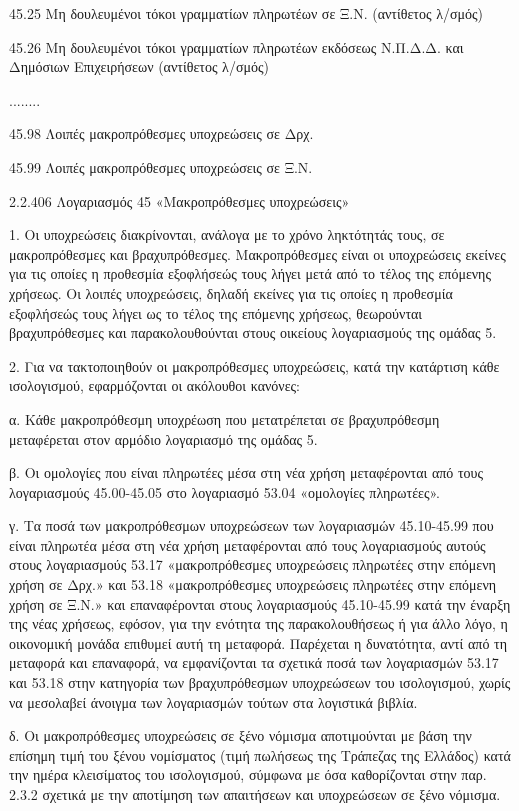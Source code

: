 \documentclass[A4,10pt,greek]{book}
\begin{document}
        45.25   Μη δουλευμένοι τόκοι γραμματίων πληρωτέων σε Ξ.Ν. (αντίθετος
                     λ/σμός)

        45.26   Μη δουλευμένοι τόκοι γραμματίων πληρωτέων εκδόσεως Ν.Π.Δ.Δ.
                     και Δημόσιων Επιχειρήσεων (αντίθετος λ/σμός)

        ........

        45.98   Λοιπές μακροπρόθεσμες υποχρεώσεις σε Δρχ.

        45.99   Λοιπές μακροπρόθεσμες υποχρεώσεις σε Ξ.Ν.

 

2.2.406 Λογαριασμός 45 «Μακροπρόθεσμες υποχρεώσεις»

1. Οι υποχρεώσεις διακρίνονται, ανάλογα με το χρόνο ληκτότητάς τους, σε μακροπρόθεσμες και βραχυπρόθεσμες. Μακροπρόθεσμες είναι οι υποχρεώσεις εκείνες για τις οποίες η προθεσμία εξοφλήσεώς τους λήγει μετά από το τέλος της επόμενης χρήσεως. Οι λοιπές υποχρεώσεις, δηλαδή εκείνες για τις οποίες η προθεσμία εξοφλήσεώς τους λήγει ως το τέλος της επόμενης χρήσεως, θεωρούνται βραχυπρόθεσμες και παρακολουθούνται στους οικείους λογαριασμούς της ομάδας 5.

2. Για να τακτοποιηθούν οι μακροπρόθεσμες υποχρεώσεις, κατά την κατάρτιση κάθε ισολογισμού, εφαρμόζονται οι ακόλουθοι κανόνες:

α. Κάθε μακροπρόθεσμη υποχρέωση που μετατρέπεται σε βραχυπρόθεσμη μεταφέρεται στον αρμόδιο λογαριασμό της ομάδας 5.

β. Οι ομολογίες που είναι πληρωτέες μέσα στη νέα χρήση μεταφέρονται από τους λογαριασμούς 45.00-45.05 στο λογαριασμό 53.04 «ομολογίες πληρωτέες».

γ. Τα ποσά των μακροπρόθεσμων υποχρεώσεων των λογαριασμών 45.10-45.99 που είναι πληρωτέα μέσα στη νέα χρήση μεταφέρονται από τους λογαριασμούς αυτούς στους λογαριασμούς 53.17 «μακροπρόθεσμες υποχρεώσεις πληρωτέες στην επόμενη χρήση σε Δρχ.» και 53.18 «μακροπρόθεσμες υποχρεώσεις πληρωτέες στην επόμενη χρήση σε Ξ.Ν.» και επαναφέρονται στους λογαριασμούς 45.10-45.99 κατά την έναρξη της νέας χρήσεως, εφόσον, για την ενότητα της παρακολουθήσεως ή για άλλο λόγο, η οικονομική μονάδα επιθυμεί αυτή τη μεταφορά. Παρέχεται η δυνατότητα, αντί από τη μεταφορά και επαναφορά, να εμφανίζονται τα σχετικά ποσά των λογαριασμών 53.17 και 53.18 στην κατηγορία των βραχυπρόθεσμων υποχρεώσεων του ισολογισμού, χωρίς να μεσολαβεί άνοιγμα των λογαριασμών τούτων στα λογιστικά βιβλία.

δ. Οι μακροπρόθεσμες υποχρεώσεις σε ξένο νόμισμα αποτιμούνται με βάση την επίσημη τιμή του ξένου νομίσματος (τιμή πωλήσεως της Τράπεζας της Ελλάδος) κατά την ημέρα κλεισίματος του ισολογισμού, σύμφωνα με όσα καθορίζονται στην παρ. 2.3.2 σχετικά με την αποτίμηση των απαιτήσεων και υποχρεώσεων σε ξένο νόμισμα.
\end{document}
